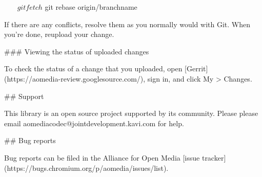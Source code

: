 \begin{DoxyCodeInclude}
~~~
    $ git fetch
    $ git rebase origin/branchname
~~~

If there are any conflicts, resolve them as you normally would with Git. When
you’re done, reupload your change.

### Viewing the status of uploaded changes

To check the status of a change that you uploaded, open
[Gerrit](https://aomedia-review.googlesource.com/), sign in, and click My >
Changes.

## Support

This library is an open source project supported by its community. Please
please email aomediacodec@jointdevelopment.kavi.com for help.

## Bug reports

Bug reports can be filed in the Alliance for Open Media
[issue tracker](https://bugs.chromium.org/p/aomedia/issues/list).
\end{DoxyCodeInclude}
 